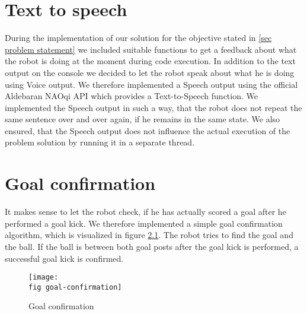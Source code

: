 \chapter{Text to speech}

During the implementation of our solution for the objective stated in \ref{sec
  problem statement} we included suitable functions to get a feedback about
what the robot is doing at the moment during code execution. In addition to the
text output on the console we decided to let the robot speak about what he is
doing using Voice output. We therefore implemented a Speech output using the
official Aldebaran NAOqi API \cite{nao} which provides a Text-to-Speech
function. We implemented the Speech output in such a way, that the robot does
not repeat the same sentence over and over again, if he remains in the same
state. We also ensured, that the Speech output does not influence the actual
execution of the problem solution by running it in a separate thread.

\chapter{Goal confirmation}

It makes sense to let the robot check, if he has actually scored a goal after
he performed a goal kick. We therefore implemented a simple goal confirmation
algorithm, which is visualized in figure \ref{j figure goal confirmation}. The
robot tries to find the goal and the ball. If the ball is between both goal
posts after the goal kick is performed, a successful goal kick is confirmed.

\begin{figure}[ht]
  \texttt{[image: \\fig goal-confirmation]}
  \caption{Goal confirmation}
  \label{j figure goal confirmation}
\end{figure}
